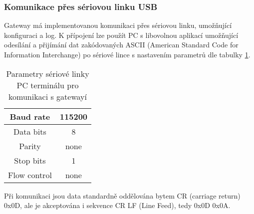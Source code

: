 
\subsubsection{Komunikace přes sériovou linku USB}
\label{Komunikace přes sériovou linku}
Gateway má implementovanou komunikaci přes sériovou linku, umožňující konfiguraci a log. 
K přípojení lze použít PC s libovolnou aplikací umožňující odesílání a přijímání dat zakódovaných ASCII (American Standard Code for Information Interchange) po
sériové lince s nastavením parametrů dle tabulky \ref{table:usb_term}.

\begin{table}[!h]
    \centering
    \begin{ctucolortab}
    \begin{tabular}{ |c|c| }
     \hline

     Baud rate              & 115200           \\ \hline
     Data bits              & 8                 \\ \hline
     Parity                 & none              \\ \hline
     Stop bits              & 1                 \\ \hline
     Flow control           & none               \\ \hline

    \end{tabular}
    \end{ctucolortab}
    \caption{Parametry sériové linky PC terminálu pro komunikaci s gatewayí}
    \label{table:usb_term}
\end{table}

Při komunikaci jsou data standardně oddělována bytem CR (carriage return) 0x0D, ale je akceptována i sekvence CR LF (Line Feed), tedy 0x0D 0x0A. 

